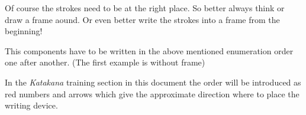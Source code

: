 \bigskip 
{}
\bigskip 
{}
\bigskip 
{} 

Of course the strokes need to be at the right place. So better always think or
draw a frame aound. Or even better write the strokes into a frame from the
beginning!

\bigskip 
{}
\bigskip 
{}
\bigskip 
{} 


\bigskip

This components have to be written in the above mentioned enumeration order one
after another. (The first example is without frame)

\bigskip 
{}
\bigskip 
{}
\bigskip 
{}

%
%

\bigskip 
{}
\bigskip 
{}
\bigskip 
{}

\bigskip

In the \textit{Katakana} training section in this document the order will be
introduced as red numbers and arrows which give the approximate direction where
to place the writing device. 

\bigskip

